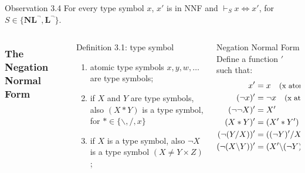 \documentclass{beamer}
\begin{document}
\begin{frame}


\begin{alertblock}{Observation 3.4}
For every type symbol $x$, $x'$ is in NNF and $\vdash_S x \Leftrightarrow x'$, for $S \in \{\textbf{NL}^\neg , \textbf{L}^\neg \}$.
\end{alertblock}  
\begin{columns}
\frametitle{The Negation Normal Form}
\begin{column}{0.4 \textwidth}
\begin{exampleblock}{Definition 3.1: type symbol}
  \begin{enumerate}
    \item atomic type symbols $x,y,w,\dots$ are type symbols;
    \item if $X$ and $Y$ are type symbols, also $(X * Y)$ is a type symbol, for $ * \in \{ \backslash , / , x \}$
    \item if $X$ is a type symbol, also $\neg X$ is a type symbol $( X \neq Y \times Z)$;
  \end{enumerate}
\end{exampleblock}
\end{column}

  \begin{column}{0.4 \textwidth}
  \begin{exampleblock}{Negation Normal Form}
  Define a function $'$ such that:
  \begin{align*}
    x' &= x \quad \text{\small (x atomic)}\\
    (\neg x)' &= \neg x \quad \text{\small (x atomic)}\\
    (\neg\neg X)' &= X' \\
    (X * Y)' &= (X' * Y') \\
    (\neg(Y/X))' &= ((\neg Y)'/X') \\
    (\neg (X\backslash Y))' &= (X' \backslash (\neg Y)')
  \end{align*}   
    \end{exampleblock} 
  \end{column}

\end{columns}
  
\end{frame}
\end{document}
